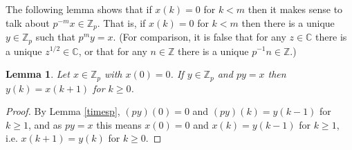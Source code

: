 \documentclass{article}
\newtheorem{lemma}[theorem]{Lemma}
\theoremstyle{definition}
\begin{document}
The following lemma shows that if $x(k)=0$ for $k<m$ then it makes sense to talk about $p^{-m}x \in \mathbb{Z}_p$. 
That is, if $x(k)=0$ for $k<m$ then there is a unique $y \in \mathbb{Z}_p$ such that $p^m y=x$. (For comparison,
it is false that for any $z \in \mathbb{C}$ there is a unique $z^{1/2} \in \mathbb{C}$, or that
for any $n \in \mathbb{Z}$ there is a unique $p^{-1}n \in \mathbb{Z}$.)


\begin{lemma}
Let $x \in \mathbb{Z}_p$ with $x(0)=0$. If $y \in \mathbb{Z}_p$ and $py=x$ then $y(k)=x(k+1)$ for $k \geq 0$.
\label{dividep}
\end{lemma}
\begin{proof}
By Lemma \ref{timesp}, $(py)(0)=0$ and $(py)(k)=y(k-1)$ for $k \geq 1$, and as $py=x$ this means
$x(0)=0$ and $x(k)=y(k-1)$ for $k \geq 1$, i.e. $x(k+1) = y(k)$ for $k \geq 0$. 
\end{proof}
 
 
\end{document}
